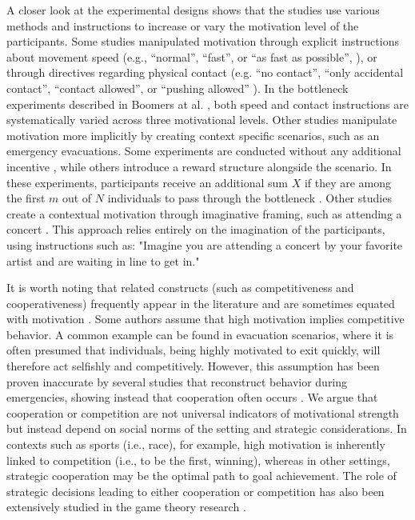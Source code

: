 \documentclass[pdflatex,sn-mathphys-num]{sn-jnl}%
\theoremstyle{thmstyleone}%
\theoremstyle{thmstyletwo}%
\theoremstyle{thmstylethree}%
\begin{document}
A closer look at the experimental designs shows that the studies use various methods and instructions to increase or vary the motivation level of the participants. Some studies manipulated motivation through explicit instructions about movement speed (e.g., “normal”, “fast”, or “as fast as possible”, \cite{peschl_passage_1971, muller_fluchtwegen_1981}), or through directives regarding physical contact (e.g. “no contact”, “only accidental contact”, “contact allowed”, or “pushing allowed”%
). In the bottleneck experiments described in Boomers at al. \cite{boomers_crowd_2023}, both speed and contact instructions are systematically varied across three motivational levels. Other studies manipulate motivation more implicitly by creating context specific scenarios, such as an emergency evacuations. Some experiments are conducted without any additional incentive \cite{li_bottleneck_2020, li_bottleneck_2021}, while others introduce a reward structure alongside the scenario. In these experiments, participants receive an additional sum $X$ if they are among the first $m$ out of $N$ individuals to pass through the bottleneck \cite{mintz_nonadaptive_1951, muir_effects_1996, li_motivation_2024}. Other studies create a contextual motivation through imaginative framing, such as attending a concert \cite{sieben_collective_2017, adrian_crowds_2020, sieben_repertoires_2025}. This approach relies entirely on the imagination of the participants, using instructions such as: "Imagine you are attending a concert by your favorite artist and are waiting in line to get in."

It is worth noting that related constructs (such as competitiveness and cooperativeness) frequently appear in the literature and are sometimes equated with motivation \cite{mintz_nonadaptive_1951, sime_escape_1983}. Some authors assume that high motivation implies competitive behavior. A common example can be found in evacuation scenarios, where it is often presumed that individuals, being highly motivated to exit quickly, will therefore act selfishly and competitively. However, this assumption has been proven inaccurate by several studies that reconstruct behavior during emergencies, showing instead that cooperation often occurs \cite{drury_collective_2009, levine_identity_2005}. We argue that  cooperation or competition are not universal indicators of motivational strength but instead depend on social norms of the setting and strategic considerations. In contexts such as sports (i.e., race), for example, high motivation is inherently linked to competition (i.e., to be the first, winning), whereas in other settings, strategic cooperation may be the optimal path to goal achievement. The role of strategic decisions leading to either cooperation or competition has also been extensively studied in the game theory research \cite{axelrod_evolution_1981}. 
\end{document}
